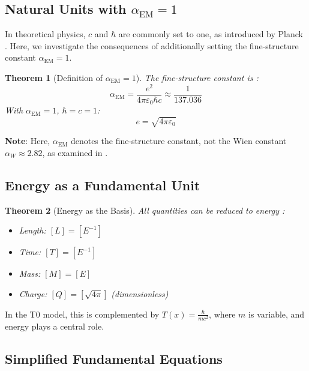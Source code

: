 \documentclass[12pt,a4paper]{article}
\newcommand{\Tfield}{T(x)}
\newcommand{\alphaEM}{\alpha_{\text{EM}}}
\newtheorem{theorem}{Theorem}[section]
\begin{document}
	\subsection{Natural Units with \(\alphaEM = 1\)}
	
	In theoretical physics, \(c\) and \(\hbar\) are commonly set to one, as introduced by Planck \cite{planck1899}. Here, we investigate the consequences of additionally setting the fine-structure constant \(\alphaEM = 1\).
	
	\begin{theorem}[Definition of \(\alphaEM = 1\)]
		The fine-structure constant is \cite{Feynman1985}:
		\begin{equation}
			\alphaEM = \frac{e^2}{4\pi\varepsilon_0 \hbar c} \approx \frac{1}{137.036}
		\end{equation}
		With \(\alphaEM = 1\), \(\hbar = c = 1\):
		\begin{equation}
			e = \sqrt{4\pi\varepsilon_0}
		\end{equation}
	\end{theorem}
	
	\textbf{Note}: Here, \(\alphaEM\) denotes the fine-structure constant, not the Wien constant \(\alpha_W \approx 2.82\), as examined in \cite{pascher_temp_2025}.
	
	\subsection{Energy as a Fundamental Unit}
	
	\begin{theorem}[Energy as the Basis]
		All quantities can be reduced to energy \cite{Duff2002}:
		\begin{itemize}
			\item Length: \([L] = [E^{-1}]\)
			\item Time: \([T] = [E^{-1}]\)
			\item Mass: \([M] = [E]\)
			\item Charge: \([Q] = [\sqrt{4\pi}]\) (dimensionless)
		\end{itemize}
	\end{theorem}
	
	In the T0 model, this is complemented by \(\Tfield = \frac{\hbar}{m c^2}\), where \(m\) is variable, and energy plays a central role.
	
	\subsection{Simplified Fundamental Equations}
	
\end{document}
